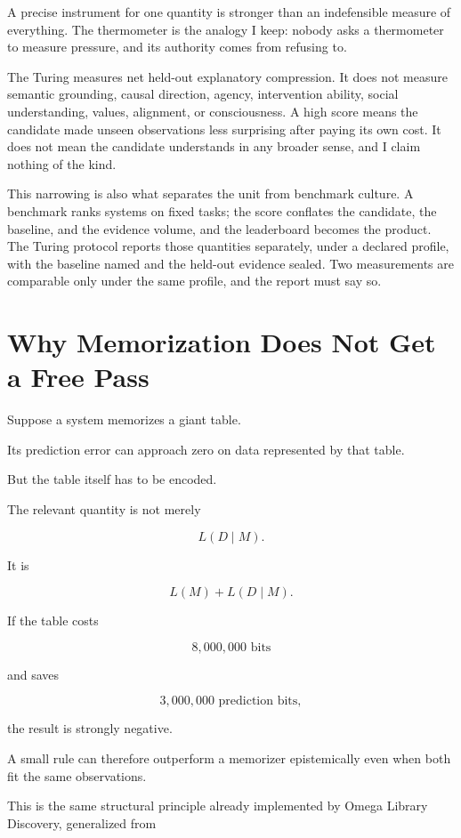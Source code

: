 \documentclass[11pt]{article}
\begin{document}
A precise instrument for one quantity is stronger than an indefensible measure of everything. The thermometer is the analogy I keep: nobody asks a thermometer to measure pressure, and its authority comes from refusing to.

The Turing measures net held-out explanatory compression. It does not measure semantic grounding, causal direction, agency, intervention ability, social understanding, values, alignment, or consciousness. A high score means the candidate made unseen observations less surprising after paying its own cost. It does not mean the candidate understands in any broader sense, and I claim nothing of the kind.

This narrowing is also what separates the unit from benchmark culture. A benchmark ranks systems on fixed tasks; the score conflates the candidate, the baseline, and the evidence volume, and the leaderboard becomes the product. The Turing protocol reports those quantities separately, under a declared profile, with the baseline named and the held-out evidence sealed. Two measurements are comparable only under the same profile, and the report must say so.

\section{Why Memorization Does Not Get a Free Pass}

Suppose a system memorizes a giant table.

Its prediction error can approach zero on data represented by that table.

But the table itself has to be encoded.

The relevant quantity is not merely

\[
L(D\mid M).
\]

It is

\[
L(M)+L(D\mid M).
\]

If the table costs

\[
8{,}000{,}000\text{ bits}
\]

and saves

\[
3{,}000{,}000\text{ prediction bits},
\]

the result is strongly negative.

A small rule can therefore outperform a memorizer epistemically even when both fit the same observations.

This is the same structural principle already implemented by Omega Library Discovery, generalized from
\end{document}

